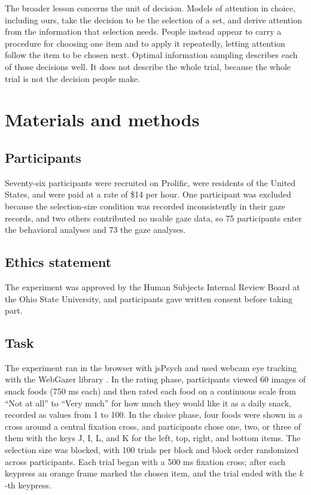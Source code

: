 \documentclass[10pt,letterpaper]{article}
\begin{document}
The broader lesson concerns the unit of decision. Models of attention in
choice, including ours, take the decision to be the selection of a set,
and derive attention from the information that selection needs. People
instead appear to carry a procedure for choosing one item and to apply
it repeatedly, letting attention follow the item to be chosen next.
Optimal information sampling describes each of those decisions well. It
does not describe the whole trial, because the whole trial is not the
decision people make.

\section*{Materials and methods}\label{materials-and-methods}

\subsection*{Participants}\label{participants}

Seventy-six participants were recruited on Prolific, were residents of
the United States, and were paid at a rate of \$14 per hour. One
participant was excluded because the selection-size condition was
recorded inconsistently in their gaze records, and two others
contributed no usable gaze data, so 75 participants enter the behavioral
analyses and 73 the gaze analyses.

\subsection*{Ethics statement}\label{ethics-statement}

The experiment was approved by the Human Subjects Internal Review Board
at the Ohio State University, and participants gave written consent
before taking part.

\subsection*{Task}\label{task}

The experiment ran in the browser with jsPsych \cite{deleeuw2015} and
used webcam eye tracking with the WebGazer library
\cite{papoutsaki2016,yang2021}. In the rating phase, participants viewed
60 images of snack foods (750 ms each) and then rated each food on a
continuous scale from ``Not at all'' to ``Very much'' for how much they
would like it as a daily snack, recorded as values from 1 to 100. In the
choice phase, four foods were shown in a cross around a central fixation
cross, and participants chose one, two, or three of them with the keys
J, I, L, and K for the left, top, right, and bottom items. The selection
size was blocked, with 100 trials per block and block order randomized
across participants. Each trial began with a 500 ms fixation cross;
after each keypress an orange frame marked the chosen item, and the
trial ended with the \(k\)-th keypress.
\end{document}
